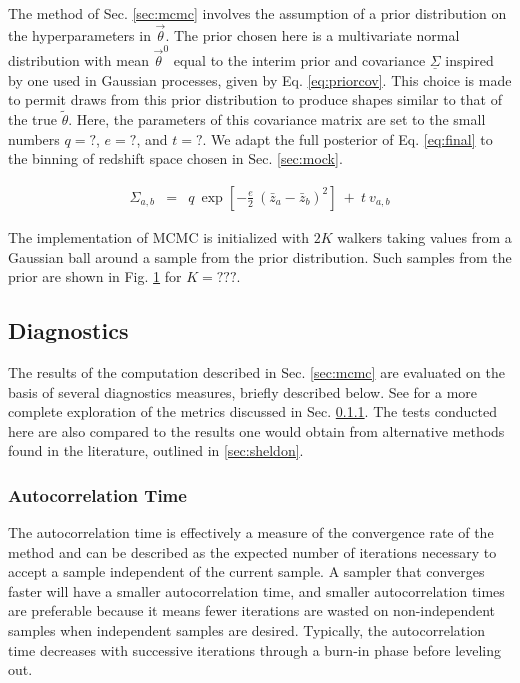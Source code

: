 \documentclass[preprint]{aastex}
\newcommand{\textul}{\underline}
\begin{document}
The method of Sec. \ref{sec:mcmc} involves the assumption of a prior 
distribution on the hyperparameters in $\vec{\theta}$.  The prior chosen here 
is a multivariate normal distribution with mean $\vec{\theta}^{0}$ equal to the 
interim prior and covariance $\textul{\Sigma}$ inspired by one used in Gaussian 
processes, given by Eq. \ref{eq:priorcov}.  This choice is made to permit draws 
from this prior distribution to produce shapes similar to that of the true 
$\tilde{\theta}$.  Here, the parameters of this covariance matrix are set to 
the small numbers $q=?$, $e=?$, and $t=?$.  We adapt the full posterior of Eq. 
\ref{eq:final} to the binning of redshift space chosen in Sec. \ref{sec:mock}.

\begin{eqnarray}
\label{eq:priorcov}
\Sigma_{a,b} &=& q\ \exp[-\frac{e}{2}\ (\bar{z}_{a}-\bar{z}_{b})^{2}]\ +\ t\ 
v_{a,b}
\end{eqnarray}

The implementation of MCMC is initialized with $2K$ walkers taking values from 
a Gaussian ball around a sample from the prior distribution.  Such samples from 
the prior are shown in Fig. \ref{fig:nullprior} for $K=???$.

\begin{figure}
\caption{}
\label{fig:nullprior}
\end{figure}

\clearpage
\subsection{Diagnostics}
\label{sec:diag}

The results of the computation described in Sec. \ref{sec:mcmc} are evaluated 
on the basis of several diagnostics measures, briefly described below.  See 
\citet{Foreman-Mackey2013} for a more complete exploration of the metrics 
discussed in Sec. \ref{sec:acorr}.  The tests conducted here are also compared 
to the results one would obtain from alternative methods found in the 
literature, outlined in \ref{sec:sheldon}.

\clearpage
\subsubsection{Autocorrelation Time}
\label{sec:acorr}

The autocorrelation time is effectively a measure of the convergence rate of 
the method and can be described as the expected number of iterations necessary 
to accept a sample independent of the current sample.  A sampler that converges 
faster will have a smaller autocorrelation time, and smaller autocorrelation 
times are preferable because it means fewer iterations are wasted on 
non-independent samples when independent samples are desired.  Typically, the 
autocorrelation time decreases with successive iterations through a burn-in 
phase before leveling out.
\end{document}
